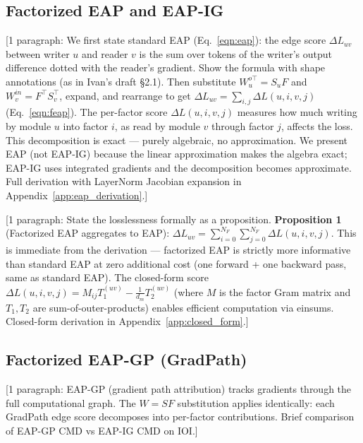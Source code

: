 \documentclass[11pt]{article}
\begin{document}
\subsection{Factorized EAP and EAP-IG}

[1 paragraph: We first state standard EAP (Eq.~\ref{eqn:eap}): the edge
score $\Delta L_{uv}$ between writer $u$ and reader $v$ is the sum over
tokens of the writer's output difference dotted with the reader's gradient.
Show the formula with shape annotations (as in Ivan's draft \S2.1). Then
substitute $W_u^{o\top} = S_u F$ and $W_v^{in} = F^\top S_v^\top$,
expand, and rearrange to get
$\Delta L_{uv} = \sum_{i,j} \Delta L(u,i,v,j)$ (Eq.~\ref{eqn:feap}).
The per-factor score $\Delta L(u,i,v,j)$ measures how much writing by
module $u$ into factor $i$, as read by module $v$ through factor $j$,
affects the loss. This decomposition is exact --- purely algebraic, no
approximation. We present EAP (not EAP-IG) because the linear
approximation makes the algebra exact; EAP-IG uses integrated gradients
and the decomposition becomes approximate.
Full derivation with LayerNorm Jacobian expansion in
Appendix~\ref{app:eap_derivation}.]


[1 paragraph: State the losslessness formally as a proposition.
\textbf{Proposition 1} (Factorized EAP aggregates to EAP):
$\Delta L_{uv} = \sum_{i=0}^{N_F} \sum_{j=0}^{N_F} \Delta L(u,i,v,j)$.
This is immediate from the derivation --- factorized EAP is strictly
more informative than standard EAP at zero additional cost (one forward
+ one backward pass, same as standard EAP). The closed-form score
$\Delta L(u,i,v,j) = M_{ij} T_1^{(uv)} - \frac{1}{d_m} T_2^{(uv)}$
(where $M$ is the factor Gram matrix and $T_1, T_2$ are sum-of-outer-products)
enables efficient computation via einsums.
Closed-form derivation in Appendix~\ref{app:closed_form}.]

\subsection{Factorized EAP-GP (GradPath)}

[1 paragraph: EAP-GP (gradient path attribution) tracks gradients
through the full computational graph. The $W = SF$ substitution
applies identically: each GradPath edge score decomposes into
per-factor contributions. Brief comparison of EAP-GP CMD vs
EAP-IG CMD on IOI.]

\end{document}
